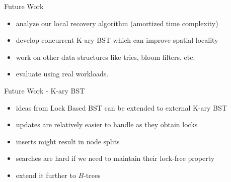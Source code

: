 \begin{frame}{Future Work}
\begin{itemize}
\item analyze our local recovery algorithm (amortized time complexity)
\item develop concurrent K-ary BST which can improve spatial locality
\item work on other data structures like tries, bloom filters, etc.
\item evaluate using real workloads.
\end{itemize}
\end{frame}

\begin{frame}{Future Work - K-ary BST}
\begin{itemize}
\item ideas from Lock Based BST can be extended to external K-ary BST
\item updates are relatively easier to handle as they obtain locks
\item inserts might result in  node splits
\item searches are hard if we need to maintain their lock-free property
\item extend it further to $B$-trees
\end{itemize}
\end{frame}

\begin{comment}
\begin{frame}{Future Work - Local Recovery}
\begin{itemize}
\item currently upon failure, an operation restarts from the root
\item Ellen et.al[PODC'14] have shown that local recovery can be done for external BST
\item Local recovery on an internal BST is hard due to key movements
\item We are currently working on extending our algorithms to enable local recovery
\end{itemize}
\end{frame}

\begin{frame}{Future Work - other data structures}
\begin{itemize}
\item Tries are extensively used in text processing
\item Tree like structure. So our ideas $can$ $possibly$ be applied
\end{itemize}
\end{frame}
\end{comment}